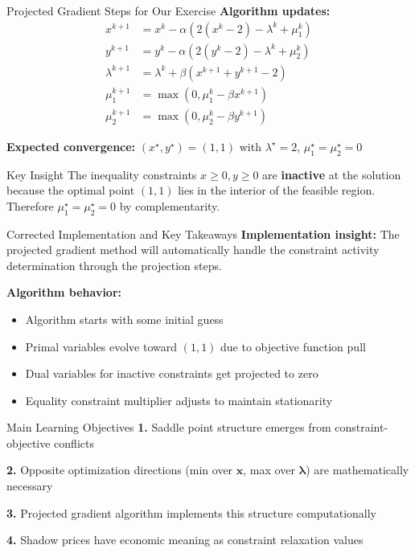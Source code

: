 \documentclass[aspectratio=1610]{beamer}
\begin{document}
\begin{frame}{Projected Gradient Steps for Our Exercise}
  \textbf{Algorithm updates:}
  \begin{align}
    x^{k+1} &= x^k - \alpha(2(x^k-2) - \lambda^k + \mu_1^k)\\
    y^{k+1} &= y^k - \alpha(2(y^k-2) - \lambda^k + \mu_2^k)\\
    \lambda^{k+1} &= \lambda^k + \beta(x^{k+1} + y^{k+1} - 2)\\
    \mu_1^{k+1} &= \max(0, \mu_1^k - \beta x^{k+1})\\
    \mu_2^{k+1} &= \max(0, \mu_2^k - \beta y^{k+1})
  \end{align}
  
  \vspace{0.3cm}
  \textbf{Expected convergence:} $(x^{\star}, y^{\star}) = (1, 1)$ with $\lambda^{\star} = 2$, $\mu_1^{\star} = \mu_2^{\star} = 0$
  
  \vspace{0.3cm}
  \begin{alertblock}{Key Insight}
    The inequality constraints $x \geq 0, y \geq 0$ are \textbf{inactive} at the solution because the optimal point $(1,1)$ lies in the interior of the feasible region. Therefore $\mu_1^{\star} = \mu_2^{\star} = 0$ by complementarity.
  \end{alertblock}
\end{frame}


\begin{frame}{Corrected Implementation and Key Takeaways}
  \textbf{Implementation insight:} The projected gradient method will automatically handle the constraint activity determination through the projection steps.
  
  \vspace{0.3cm}
  \textbf{Algorithm behavior:}
  \begin{itemize}
    \item Algorithm starts with some initial guess
    \item Primal variables evolve toward $(1,1)$ due to objective function pull
    \item Dual variables for inactive constraints get projected to zero
    \item Equality constraint multiplier adjusts to maintain stationarity
  \end{itemize}
  
  \vspace{0.5cm}
  \begin{block}{Main Learning Objectives}
    \textbf{1.} Saddle point structure emerges from constraint-objective conflicts
    
    \textbf{2.} Opposite optimization directions (min over $\mathbf{x}$, max over $\boldsymbol{\lambda}$) are mathematically necessary
    
    \textbf{3.} Projected gradient algorithm implements this structure computationally
    
    \textbf{4.} Shadow prices have economic meaning as constraint relaxation values
  \end{block}
\end{frame}
\end{document}
